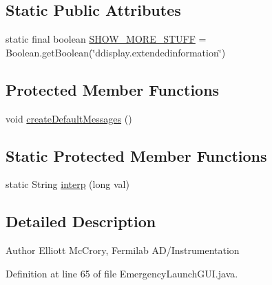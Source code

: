 \subsection*{Static Public Attributes}
\begin{DoxyCompactItemize}
\item 
static final boolean \hyperlink{classgov_1_1fnal_1_1ppd_1_1dd_1_1emergency_1_1EmergencyLaunchGUI_a38b676d30b6ac1c12dbc4b790f93b729}{S\-H\-O\-W\-\_\-\-M\-O\-R\-E\-\_\-\-S\-T\-U\-F\-F} = Boolean.\-get\-Boolean(\char`\"{}ddisplay.\-extendedinformation\char`\"{})
\end{DoxyCompactItemize}
\subsection*{Protected Member Functions}
\begin{DoxyCompactItemize}
\item 
void \hyperlink{classgov_1_1fnal_1_1ppd_1_1dd_1_1emergency_1_1EmergencyLaunchGUI_ac3a291908743dcb58758bfc8d56ce127}{create\-Default\-Messages} ()
\end{DoxyCompactItemize}
\subsection*{Static Protected Member Functions}
\begin{DoxyCompactItemize}
\item 
static String \hyperlink{classgov_1_1fnal_1_1ppd_1_1dd_1_1emergency_1_1EmergencyLaunchGUI_a7d9de8a18d1e65facf89c233cfcafc83}{interp} (long val)
\end{DoxyCompactItemize}


\subsection{Detailed Description}
\begin{DoxyAuthor}{Author}
Elliott Mc\-Crory, Fermilab A\-D/\-Instrumentation 
\end{DoxyAuthor}


Definition at line 65 of file Emergency\-Launch\-G\-U\-I.\-java.



